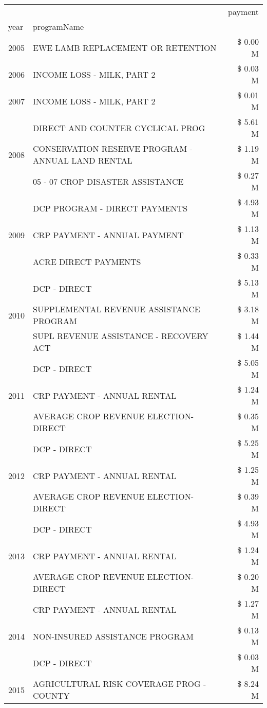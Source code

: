 \begin{tabular}{llr}
\toprule
 &  & payment \\
year & programName &  \\
\midrule
2005 & EWE LAMB REPLACEMENT OR RETENTION & \$ 0.00 M \\
\cline{1-3}
2006 & INCOME LOSS - MILK, PART 2 & \$ 0.03 M \\
\cline{1-3}
2007 & INCOME LOSS - MILK, PART 2 & \$ 0.01 M \\
\cline{1-3}
\multirow[t]{3}{*}{2008} & DIRECT AND COUNTER CYCLICAL PROG & \$ 5.61 M \\
 & CONSERVATION RESERVE PROGRAM - ANNUAL LAND RENTAL & \$ 1.19 M \\
 & 05 - 07 CROP DISASTER ASSISTANCE & \$ 0.27 M \\
\cline{1-3}
\multirow[t]{3}{*}{2009} & DCP PROGRAM - DIRECT PAYMENTS & \$ 4.93 M \\
 & CRP PAYMENT - ANNUAL PAYMENT & \$ 1.13 M \\
 & ACRE DIRECT PAYMENTS & \$ 0.33 M \\
\cline{1-3}
\multirow[t]{3}{*}{2010} & DCP - DIRECT & \$ 5.13 M \\
 & SUPPLEMENTAL REVENUE ASSISTANCE PROGRAM & \$ 3.18 M \\
 & SUPL REVENUE ASSISTANCE - RECOVERY ACT & \$ 1.44 M \\
\cline{1-3}
\multirow[t]{3}{*}{2011} & DCP - DIRECT & \$ 5.05 M \\
 & CRP PAYMENT - ANNUAL RENTAL & \$ 1.24 M \\
 & AVERAGE CROP REVENUE ELECTION-DIRECT & \$ 0.35 M \\
\cline{1-3}
\multirow[t]{3}{*}{2012} & DCP - DIRECT & \$ 5.25 M \\
 & CRP PAYMENT - ANNUAL RENTAL & \$ 1.25 M \\
 & AVERAGE CROP REVENUE ELECTION-DIRECT & \$ 0.39 M \\
\cline{1-3}
\multirow[t]{3}{*}{2013} & DCP - DIRECT & \$ 4.93 M \\
 & CRP PAYMENT - ANNUAL RENTAL & \$ 1.24 M \\
 & AVERAGE CROP REVENUE ELECTION-DIRECT & \$ 0.20 M \\
\cline{1-3}
\multirow[t]{3}{*}{2014} & CRP PAYMENT - ANNUAL RENTAL & \$ 1.27 M \\
 & NON-INSURED ASSISTANCE PROGRAM & \$ 0.13 M \\
 & DCP - DIRECT & \$ 0.03 M \\
\cline{1-3}
\multirow[t]{3}{*}{2015} & AGRICULTURAL RISK COVERAGE PROG - COUNTY & \$ 8.24 M \\

\end{tabular}
